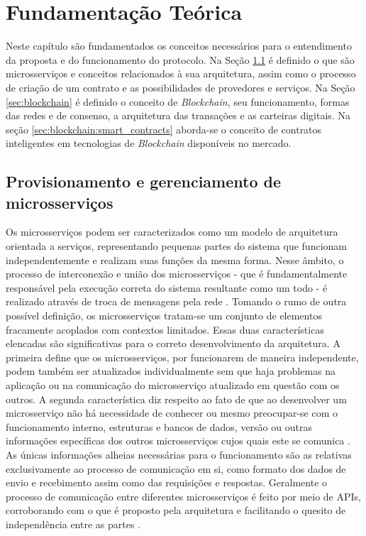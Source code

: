 \newcommand{\COMMENT}[1]{\noindent\fbox{\parbox{0.98\linewidth}{\bfseries #1}}}


\chapter{Fundamentação Teórica}
\label{ch:fundamentos}

Neste capítulo são fundamentados os conceitos necessários para o entendimento da proposta e do funcionamento do protocolo. Na Seção \ref{sec:microsservicos} é definido o que são microsserviços e conceitos relacionados à sua arquitetura, assim como o processo de criação de um contrato e as possibilidades de provedores e serviços. Na Seção \ref{sec:blockchain} é definido o conceito de \textit{Blockchain}, seu funcionamento, formas das redes e de consenso, a arquitetura das transações e as carteiras digitais. Na seção \ref{sec:blockchain:smart_contracts} aborda-se o conceito de contratos inteligentes em tecnologias de \textit{Blockchain} disponíveis no mercado.


\section{Provisionamento e gerenciamento de microsserviços}
\label{sec:microsservicos}

Os microsserviços podem ser caracterizados como um modelo de arquitetura orientada a serviços, representando pequenas partes do sistema que funcionam independentemente e realizam suas funções da mesma forma. Nesse âmbito, o processo de interconexão e união dos microsserviços - que é fundamentalmente responsável pela execução correta do sistema resultante como um todo - é realizado através de troca de mensagens pela rede \cite{microsservicos:newman_microsservicos}.
%
Tomando o rumo de outra possível definição, os microsserviços tratam-se um conjunto de elementos fracamente acoplados com contextos limitados. Essas duas características elencadas são significativas para o correto desenvolvimento da arquitetura. 
%
A primeira define que os microsserviços, por funcionarem de maneira independente, podem também ser atualizados individualmente sem que haja problemas na aplicação ou na comunicação do microsserviço atualizado em questão com os outros.
%
A segunda característica diz respeito ao fato de que ao desenvolver um microsserviço não há necessidade de conhecer ou mesmo preocupar-se com o funcionamento interno, estruturas e bancos de dados, versão ou outras informações específicas dos outros microsserviços cujos quais este se comunica \cite{microsservicos:netflix}. As únicas informações alheias necessárias para o funcionamento são as relativas exclusivamente ao processo de comunicação em si, como formato dos dados de envio e recebimento assim como das requisições e respostas.
%
Geralmente o processo de comunicação entre diferentes microsserviços é feito por meio de \acp{API}, corroborando com o que é proposto pela arquitetura e facilitando o quesito de independência entre as partes \cite{microsservicos:newman_microsservicos, microsservicos:empresas}.

